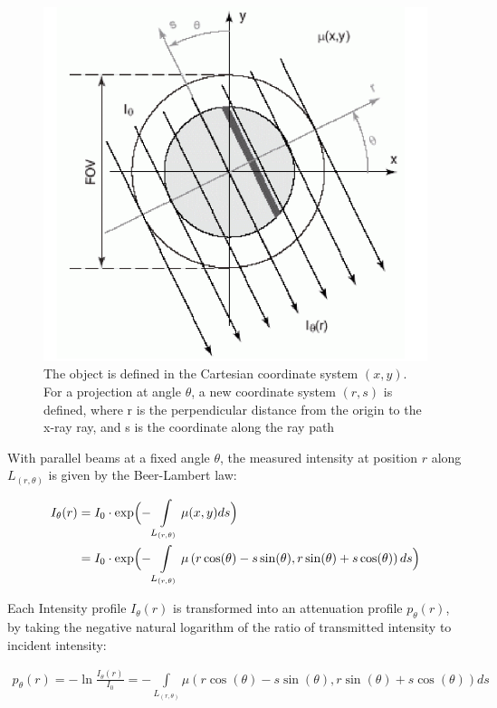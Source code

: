 \documentclass{article}
\theoremstyle{definition}
\begin{document}
\begin{figure}[H]
	\includegraphics[scale=0.6]{coordinate_system.png}
	\caption{The object is defined in the Cartesian coordinate system $(x,y)$. For a projection at angle $\theta$, a new coordinate system $(r,s)$ is defined, where r is the perpendicular distance from the origin to the x-ray ray, and s is the coordinate along the ray path}
	\label{fig:coord}
\end{figure}

With parallel beams at a fixed angle $\theta$, the measured intensity at position $r$ along $L_{(r,\theta)}$ is given by the Beer-Lambert law:

\begin{align}
I_{\theta}(r) &= I_0 \cdot \exp\Bigl({-\int\limits_{L_{(r,\theta)}} \mu (x,y) ds} \Bigr) \\
& = I_0 \cdot \exp\Bigl({-\int\limits_{L_{(r,\theta)}} \mu \left(r \cos(\theta) - s \sin(\theta),r \sin(\theta) + s \cos(\theta)\right) ds} \Bigr) 
\end{align}

Each Intensity profile $I_\theta (r)$ is transformed into an attenuation profile $p_\theta (r)$, by taking the negative natural logarithm of the ratio of transmitted intensity to incident intensity:

\begin{align}
p_\theta (r) = - \ln \frac{I_\theta (r)}{I_0} = -\int\limits_{L_{(r,\theta)}} \mu \left(r \cos(\theta) - s \sin(\theta),r \sin(\theta) + s \cos(\theta)\right) ds
\end{align}
\end{document}
